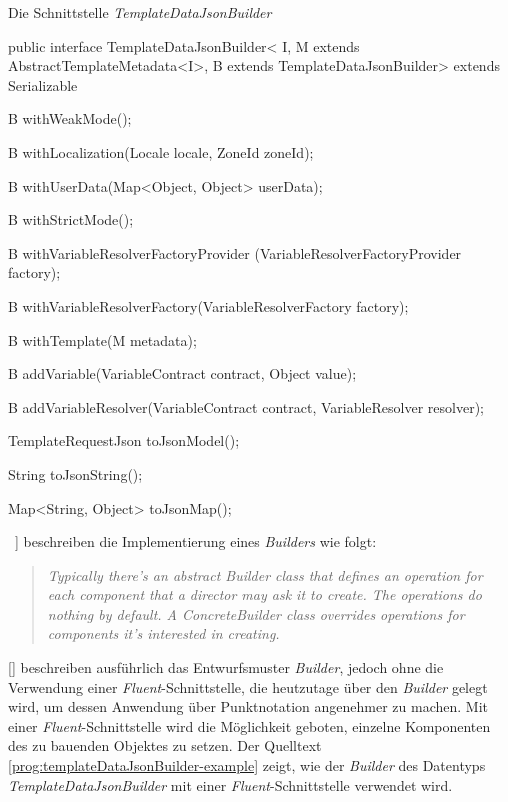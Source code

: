\begin{program}
\caption{Die Schnittstelle \emph{TemplateDataJsonBuilder}}
\label{prog:templateDataJsonBuilder}
\begin{JavaCode}
public interface TemplateDataJsonBuilder<
    I,
    M extends AbstractTemplateMetadata<I>,
    B extends TemplateDataJsonBuilder> extends Serializable {

    B withWeakMode();

    B withLocalization(Locale locale,
                       ZoneId zoneId);

    B withUserData(Map<Object, Object> userData);

    B withStrictMode();

    B withVariableResolverFactoryProvider
                         (VariableResolverFactoryProvider factory);

    B withVariableResolverFactory(VariableResolverFactory factory);

    B withTemplate(M metadata);

    B addVariable(VariableContract contract, Object value);

    B addVariableResolver(VariableContract contract,
                          VariableResolver resolver);

    TemplateRequestJson toJsonModel();

    String toJsonString();

    Map<String, Object> toJsonMap();
    
}
\end{JavaCode}
\end{program}
\ \newline 
[\cite[100]{designPatterns}] beschreiben die Implementierung eines \emph{Builders} wie folgt:
\begin{quote}
\emph{Typically there's an abstract Builder class that defines an operation for each component that a director may ask it to create. The operations do nothing by default. A ConcreteBuilder class overrides operations for components it's interested in creating.}
\end{quote}
[\cite[96 - 106]{designPatterns}] beschreiben ausführlich das Entwurfsmuster \emph{Builder}, jedoch ohne die Verwendung einer \emph{Fluent}-Schnittstelle, die heutzutage über den \emph{Builder} gelegt wird, um dessen Anwendung über Punktnotation angenehmer zu machen. Mit einer \emph{Fluent}-Schnittstelle wird die Möglichkeit geboten, einzelne Komponenten des zu bauenden Objektes zu setzen. Der Quelltext \ref{prog:templateDataJsonBuilder-example} zeigt, wie der \emph{Builder} des Datentyps \emph{TemplateDataJsonBuilder} mit einer \emph{Fluent}-Schnittstelle verwendet wird.

